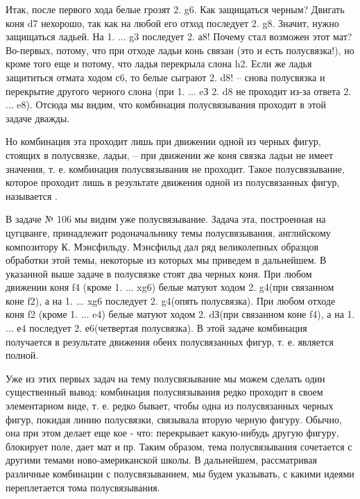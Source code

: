 Итак, после первого хода белые грозят 2. \knight{}g6\mate{}. Как защищаться черным? Двигать коня d7 нехорошо, так как на любой его отход последует 2. \queen{}g8\mate{}. Значит, нужно защищаться ладьей. На 1. ... \rook{}g3 последует 2. \queen{}а8\mate{}! Почему стал возможен этот мат? Во-первых, потому, что при отходе ладьи конь связан (это и есть полусвязка!), но кроме того еще и потому, что ладья перекрыла слона h2. Если же ладья защититься отмата ходом \rook{}с6, то белые сыграют 2. \rook{}d8\mate{}! -- снова полусвязка и перекрытие другого черного слона (при 1. ... \rook{}eЗ 2. \rook{}d8 не проходит из-за ответа 2. ... \bishop{}e8). Отсюда мы видим, что комбинация полусвязывания проходит в этой задаче дважды.

Но комбинация эта проходит лишь при движении одной из черных фигур, стоящих в полусвязке, ладьи, -- при движении же коня связка ладьи не имеет значения, т. е. комбинация полусвязывания не проходит. Такое полусвязывание, которое проходит лишь в результате движения одной из полусвязанных фигур, называется .

В задаче № 106 мы видим уже  полусвязывание. Задача эта, построенная на цугцванге, принадлежит родоначальнику темы полусвязывания, английскому композитору К. Мэнсфильду. Мэнсфильд дал ряд великолепных образцов обработки этой темы, некоторые из которых мы приведем в дальнейшем. В указанной выше задаче в полусвязке стоят два черных коня. При любом движении коня f4 (кроме 1. ... \knight{}xg6) белые матуют ходом 2. \queen{}g4\mate (при связанном коне f2), а на 1. ... \knight{}xg6 последует 2. g4\mate (опять полусвязка). При любом отходе коня f2 (кроме 1. ... \knight{}e4) белые матуют ходом 2. \queen{}dЗ\mate (при связанном коне f4), а на 1. ... \knight{}е4 последует 2. \queen{}е6\mate (четвертая полусвязка). В этой задаче комбинация получается в результате движения обеих полусвязанных фигур, т. е. является полной.

Уже из этих первых задач на тему полусвязывание мы можем сделать один существенный вывод: комбинация полусвязывания редко проходит в своем элементарном виде, т. е. редко бывает, чтобы одна из полусвязанных черных фигур, покидая линию полусвязки,  связывала вторую черную фигуру. Обычно, она при этом делает еще кое - что: перекрывает какую-нибудь другую фигуру, блокирует поле, дает мат и пр. Таким образом, тема полусвязывания сочетается с другими темами ново-американской школы. В дальнейшем, рассматривая различные комбинации с полусвязыванием, мы будем указывать, с какими идеями переплетается тома полусвязывания.

